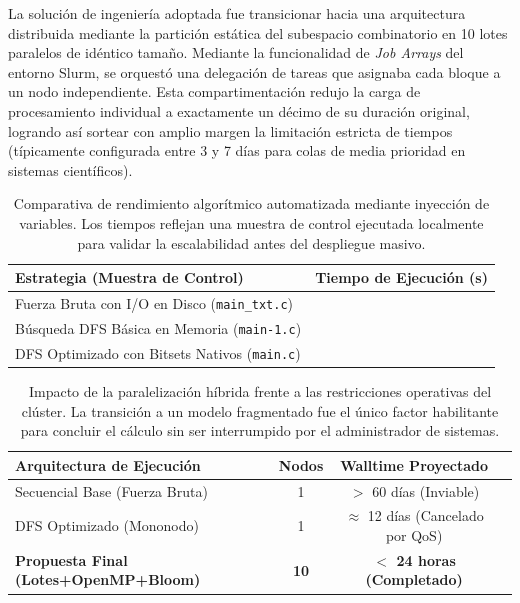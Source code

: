 \documentclass[12pt,a4paper]{tfg_domingo}
\begin{document}
La solución de ingeniería adoptada fue transicionar hacia una
arquitectura distribuida mediante la partición estática del subespacio
combinatorio en 10 lotes paralelos de idéntico tamaño. Mediante la
funcionalidad de \emph{Job Arrays} del entorno Slurm, se orquestó una
delegación de tareas que asignaba cada bloque a un nodo
independiente. Esta compartimentación redujo la carga de procesamiento
individual a exactamente un décimo de su duración original, logrando
así sortear con amplio margen la limitación estricta de tiempos
(típicamente configurada entre 3 y 7 días para colas de media
prioridad en sistemas científicos). 

\begin{table}[htb!]
\centering
\begin{tcolorbox}[colback=blue!5!white,colframe=blue!75!black,title={Comparativa de Tiempos de Ejecución Local para Benchmarks de Control}]
\begin{tabular}{lc}
\textbf{Estrategia (Muestra de Control)} & \textbf{Tiempo de Ejecución (s)} \\ \hline
Fuerza Bruta con I/O en Disco (\texttt{main\_txt.c}) & \textbf{\tiempoAppText{}} \\
Búsqueda DFS Básica en Memoria (\texttt{main-1.c}) & \textbf{\tiempoAppOne{}} \\
DFS Optimizado con Bitsets Nativos (\texttt{main.c}) & \textbf{\tiempoAppOpt{}} \\ \hline
\end{tabular}
\end{tcolorbox}
\caption{Comparativa de rendimiento algorítmico automatizada mediante inyección de variables. Los tiempos reflejan una muestra de control ejecutada localmente para validar la escalabilidad antes del despliegue masivo.}
\label{tab:performance_local}
\end{table}

\begin{table}[htb!]
\centering
\begin{tcolorbox}[colback=blue!5!white,colframe=blue!75!black,title={Proyección de Viabilidad Operativa en Altamira ($\ell=75$)}]
\begin{tabular}{lccc}
\textbf{Arquitectura de Ejecución} & \textbf{Nodos} & \textbf{Walltime Proyectado} \\ \hline
Secuencial Base (Fuerza Bruta) & 1 & $>$ 60 días (Inviable) \\
DFS Optimizado (Mononodo) & 1 & $\approx$ 12 días (Cancelado por QoS) \\
\textbf{Propuesta Final (Lotes+OpenMP+Bloom)} & \textbf{10} & \textbf{$<$ 24 horas (Completado)} \\ \hline
\end{tabular}
\end{tcolorbox}
\caption{Impacto de la paralelización híbrida frente a las restricciones operativas del clúster. La transición a un modelo fragmentado fue el único factor habilitante para concluir el cálculo sin ser interrumpido por el administrador de sistemas.}
\label{tab:performance_altamira}
\end{table}
\end{document}
